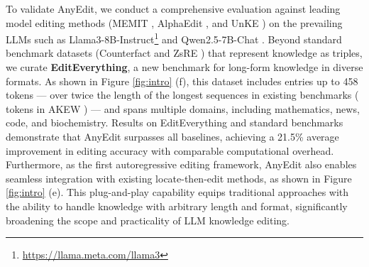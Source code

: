 To validate AnyEdit, we conduct a comprehensive evaluation against leading model editing methods (\eg MEMIT \cite{MEMIT}, AlphaEdit \cite{AlphaEdit}, and UnKE \cite{UnKE}) on the prevailing LLMs such as Llama3-8B-Instruct\footnote{\href{https://llama.meta.com/llama3}{https://llama.meta.com/llama3}} and Qwen2.5-7B-Chat \cite{qwen2.5}. Beyond standard benchmark datasets (\eg Counterfact \cite{ROME} and ZsRE \cite{MEMIT}) that represent knowledge as triples, we curate \textbf{EditEverything}, a new benchmark for long-form knowledge in diverse formats. As shown in Figure \ref{fig:intro} (f), this dataset includes entries up to 458 tokens --- over twice the length of the longest sequences in existing benchmarks ( tokens in AKEW \cite{AKEW}) --- and spans multiple domains, including mathematics, news, code, and biochemistry. Results on EditEverything and standard benchmarks demonstrate that AnyEdit surpasses all baselines, achieving a 21.5\% average improvement in editing accuracy with comparable computational overhead. Furthermore, as the first autoregressive editing framework, AnyEdit also enables seamless integration with existing locate-then-edit methods, as shown in Figure \ref{fig:intro} (e). This plug-and-play capability equips traditional approaches with the ability to handle knowledge with arbitrary length and format, significantly broadening the scope and practicality of LLM knowledge editing.




